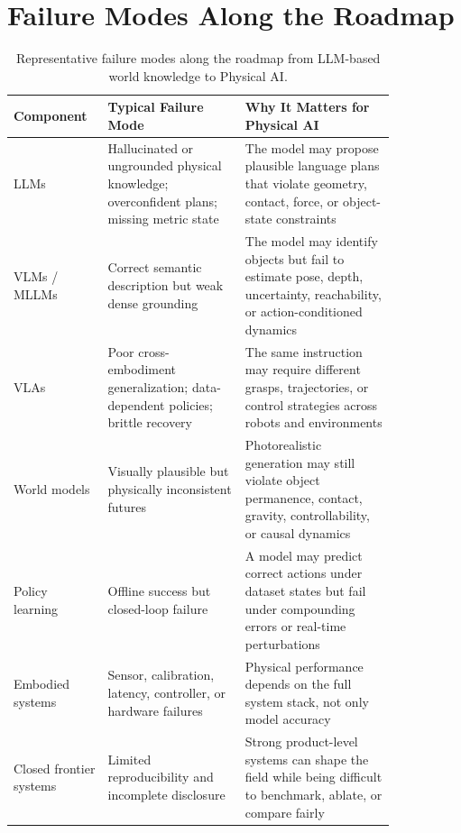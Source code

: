 \section{Failure Modes Along the Roadmap}
\label{app:failure-modes}

\begin{table}[t]
\centering
\small
\begin{tabular}{p{0.17\linewidth}p{0.32\linewidth}p{0.35\linewidth}}
\toprule
Component & Typical Failure Mode & Why It Matters for Physical AI \\
\midrule
LLMs
& Hallucinated or ungrounded physical knowledge; overconfident plans; missing metric state
& The model may propose plausible language plans that violate geometry, contact, force, or object-state constraints \\
\midrule
VLMs / MLLMs
& Correct semantic description but weak dense grounding
& The model may identify objects but fail to estimate pose, depth, uncertainty, reachability, or action-conditioned dynamics \\
\midrule
VLAs
& Poor cross-embodiment generalization; data-dependent policies; brittle recovery
& The same instruction may require different grasps, trajectories, or control strategies across robots and environments \\
\midrule
World models
& Visually plausible but physically inconsistent futures
& Photorealistic generation may still violate object permanence, contact, gravity, controllability, or causal dynamics \\
\midrule
Policy learning
& Offline success but closed-loop failure
& A model may predict correct actions under dataset states but fail under compounding errors or real-time perturbations \\
\midrule
Embodied systems
& Sensor, calibration, latency, controller, or hardware failures
& Physical performance depends on the full system stack, not only model accuracy \\
\midrule
Closed frontier systems
& Limited reproducibility and incomplete disclosure
& Strong product-level systems can shape the field while being difficult to benchmark, ablate, or compare fairly \\
\bottomrule
\end{tabular}
\caption{Representative failure modes along the roadmap from LLM-based world knowledge to Physical AI.}
\label{tab:failure-modes}
\end{table}

